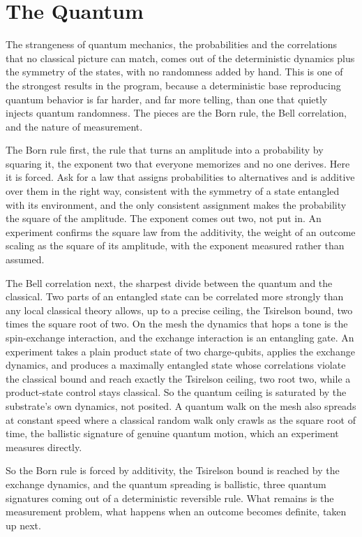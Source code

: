 \section{The Quantum}

The strangeness of quantum mechanics, the probabilities and the correlations that no classical picture can match, comes
out of the deterministic dynamics plus the symmetry of the states, with no randomness added by hand. This is one of the
strongest results in the program, because a deterministic base reproducing quantum behavior is far harder, and far more
telling, than one that quietly injects quantum randomness. The pieces are the Born rule, the Bell correlation, and the
nature of measurement.

The Born rule first, the rule that turns an amplitude into a probability by squaring it, the exponent two that everyone
memorizes and no one derives. Here it is forced. Ask for a law that assigns probabilities to alternatives and is
additive over them in the right way, consistent with the symmetry of a state entangled with its environment, and the
only consistent assignment makes the probability the square of the amplitude. The exponent comes out two, not put in. An
experiment confirms the square law from the additivity, the weight of an outcome scaling as the square of its amplitude,
with the exponent measured rather than assumed.

The Bell correlation next, the sharpest divide between the quantum and the classical. Two parts of an entangled state
can be correlated more strongly than any local classical theory allows, up to a precise ceiling, the Tsirelson bound,
two times the square root of two. On the mesh the dynamics that hops a tone is the spin-exchange interaction, and the
exchange interaction is an entangling gate. An experiment takes a plain product state of two charge-qubits, applies the
exchange dynamics, and produces a maximally entangled state whose correlations violate the classical bound and reach
exactly the Tsirelson ceiling, two root two, while a product-state control stays classical. So the quantum ceiling is
saturated by the substrate's own dynamics, not posited. A quantum walk on the mesh also spreads at constant speed where
a classical random walk only crawls as the square root of time, the ballistic signature of genuine quantum motion, which
an experiment measures directly.

So the Born rule is forced by additivity, the Tsirelson bound is reached by the exchange dynamics, and the quantum
spreading is ballistic, three quantum signatures coming out of a deterministic reversible rule. What remains is the
measurement problem, what happens when an outcome becomes definite, taken up next.
